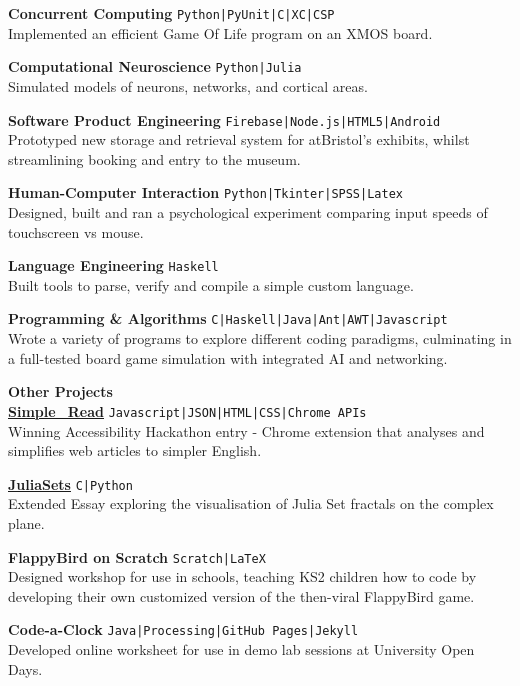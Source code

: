\documentclass[10pt]{article}
\newcommand{\sect}[1]{{\LARGE{\textbf{#1}}}\vspace{0.1em}\\}
\newcommand{\zz}[3]{{\large\textbf{#1}} \hfill {\small \colorbox{boxcol}{\texttt{#3}} }\\{#2}\vspace{0.5em}}
\newcommand{\li}{\textcolor{linecol}{|}}
\begin{document}
\begin{minipage}[t]{0.66\textwidth}
\zz{Concurrent Computing}
{Implemented an efficient Game Of Life program on an XMOS board.}{Python\li PyUnit\li C\li XC\li CSP}

\zz{Computational Neuroscience}
{Simulated models of neurons, networks, and cortical areas.}{Python\li Julia}

\zz{Software Product Engineering}
{Prototyped new storage and retrieval system for atBristol's exhibits, whilst streamlining booking and entry to the museum.}{Firebase\li Node.js\li HTML5\li Android}

\zz{Human-Computer Interaction}
{Designed, built and ran a psychological experiment comparing input speeds of touchscreen vs mouse.}{Python\li Tkinter\li SPSS\li Latex}

\zz{Language Engineering}
{Built tools to parse, verify and compile a simple custom language.}{Haskell}

\zz{Programming \& Algorithms}
{Wrote a variety of programs to explore different coding paradigms, culminating in a full-tested board game simulation with integrated AI and networking.}{C\li Haskell\li Java\li Ant\li AWT\li Javascript}
\\





\vfill


\sect{Other Projects}
\zz{\href{https://github.com/LukeStorry/simple_read}{Simple\_Read}}
{Winning Accessibility Hackathon entry - Chrome extension that analyses and simplifies web articles to simpler English.}{Javascript\li JSON\li HTML\li CSS\li Chrome APIs}

\zz{\href{https://github.com/LukeStorry/Juliasets}{JuliaSets}}{Extended Essay exploring the visualisation of Julia Set fractals on the complex plane.}{C\li Python}

\zz{FlappyBird on Scratch}{Designed workshop for use in schools, teaching KS2 children how to code by developing their own customized version of the then-viral FlappyBird game.}{Scratch\li LaTeX}

\zz{Code-a-Clock}{Developed online worksheet for use in demo lab sessions at University Open Days.}{Java\li Processing\li GitHub Pages\li Jekyll}


\end{minipage} 
\end{document}
